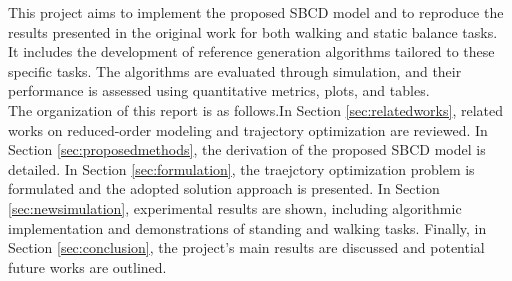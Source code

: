 \documentclass[main.tex]{subfiles}
\begin{document}
\begin{sloppypar}
This project aims to implement the proposed SBCD model and to reproduce the results presented in the original work for both walking and static balance tasks. It includes the development of reference generation algorithms tailored to these specific tasks. The algorithms are evaluated through simulation, and their performance is assessed using quantitative metrics, plots, and tables.\\
The organization of this report is as follows.In Section \ref{sec:relatedworks}, related works on reduced-order modeling and trajectory optimization are reviewed. In Section \ref{sec:proposedmethods}, the derivation of the proposed SBCD model is detailed. In Section \ref{sec:formulation}, the traejctory optimization problem is formulated and the adopted solution approach is presented. In Section \ref{sec:newsimulation}, experimental results are shown, including algorithmic implementation and demonstrations of standing and walking tasks. Finally, in Section \ref{sec:conclusion}, the project's main results are discussed and potential future works are outlined.
\end{sloppypar}
\end{document}
